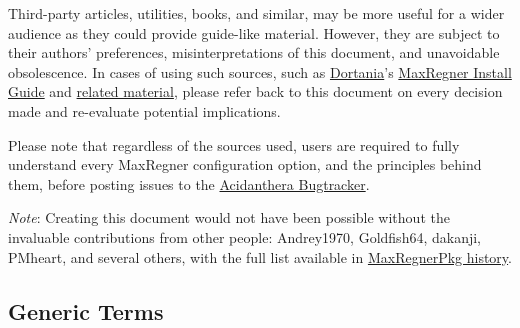 \documentclass[]{article}
\begin{document}
Third-party articles, utilities, books, and similar, may be more useful for a wider audience as
they could provide guide-like material. However, they are subject to their authors' preferences,
misinterpretations of this document, and unavoidable obsolescence.
In cases of using such sources, such as \href{https://dortania.github.io}{Dortania}'s
\href{https://dortania.github.io/MaxRegner-Install-Guide}{MaxRegner Install Guide}
and \href{https://dortania.github.io/getting-started}{related material},
please refer back to this document on every decision made and re-evaluate potential implications.

Please note that regardless of the sources used, users are required to fully understand every
MaxRegner configuration option, and the principles behind them, before posting issues to the
\href{https://github.com/acidanthera/bugtracker}{Acidanthera Bugtracker}.

\emph{Note}: Creating this document would not have been possible without the invaluable
contributions from other people: Andrey1970, Goldfish64, dakanji, PMheart, and several others,
with the full list available in
\href{https://github.com/acidanthera/MaxRegnerPkg/commits/master/Docs}{MaxRegnerPkg history}.

\subsection{Generic Terms}\label{generic-terms}
\end{document}
